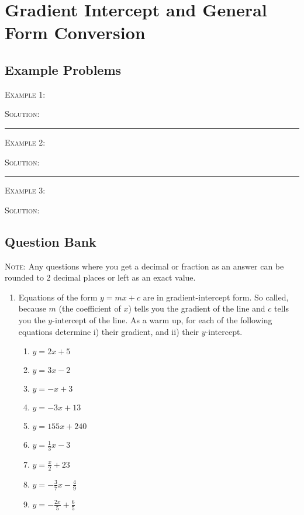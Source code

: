 \documentclass[a4paper,12pt]{article}
\begin{document}
\large
\section*{Gradient Intercept and General Form Conversion}

\subsection*{Example Problems}

\textsc{Example 1}: 

\textsc{Solution}: 

\vspace{3mm}
\hrule
\vspace{3mm}

\textsc{Example 2}: 

\textsc{Solution}: 

\vspace{3mm}
\hrule
\vspace{3mm}

\textsc{Example 3}: 

\textsc{Solution}: 

\newpage
\subsection*{Question Bank}

\textsc{Note}: Any questions where you get a decimal or fraction 
as an answer can be rounded to 2 decimal places or left as 
an exact value.

\begin{enumerate}
\item Equations of the form $y = mx + c$ are in gradient-intercept
form. So called, because $m$ (the coefficient of $x$) tells you 
the gradient of the line and $c$ tells you the $y$-intercept of 
the line. As a warm up, for each of the following equations 
determine i) their gradient, and ii) their $y$-intercept.
    \begin{multicols}{2}
    \begin{enumerate}
    \item $y = 2x + 5$
    \item $y = 3x - 2$
    \item $y = -x + 3$
    \item $y = -3x + 13$
    \item $y = 155x + 240$
    \item $y = \frac{1}{3}x - 3$
    \item $y = \frac{x}{2} + 23$
    \item $y = -\frac{3}{7}x - \frac{4}{9}$
    \item $y = -\frac{2x}{5} + \frac{6}{5}$
    \end{enumerate}
    \end{multicols}
\end{enumerate}
\end{document}
